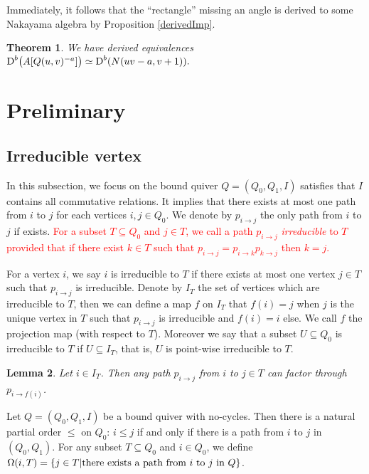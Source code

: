 \documentclass[a4paper, reqno]{amsart}
\newtheorem{thm}{Theorem}[section]
\newtheorem{lem}[thm]{Lemma}
\theoremstyle{definition}
\theoremstyle{remark}
\numberwithin{equation}{section}
\begin{document}
Immediately, it follows that the ``rectangle'' missing an angle is derived to some Nakayama algebra by Proposition \ref{derivedImp}.

\begin{thm}\label{main2}
We have derived equivalences 
${\textup{D}^{b}\big(A[Q(u,v)^{-a}]\big)} \simeq
    {\textup{D}^{b}( N(uv-a,v+1))}.$
\end{thm}
\newpage

\section{Preliminary}
\subsection{Irreducible vertex}
In this subsection, we focus on the bound quiver $Q=(Q_0,Q_1,I)$ satisfies that {\color{blue}$I$ contains all commutative relations.} It implies that there exists at most one path from $i$ to $j$ for each vertices $i,j\in Q_0$. We denote by $p_{i\to j}$ the only path from $i$ to $j$ if exists. \textcolor{red}{  For a subset $T\subseteq Q_0$ and $j\in T$, we call a path $p_{i\to j}$ \emph{irreducible} to $T$ provided that if there exist $k\in T$ such that $ p_{i\to j} = p_{i \to k} p_{k \to j} $ then $k=j$. } 

For a vertex $i$, we say $i$ is irreducible to $T$ if there exists at most one vertex $j\in T$ such that $p_{i\to j}$ is irreducible. {\color{blue}Denote by $I_T$ the set of vertices which are irreducible to $T$, then we can define a map $f$ on $I_T$ that $f(i)=j$ when $j$ is the unique vertex in $T$ such that $p_{i\rightarrow j}$ is irreducible and $f(i)=i$ else. We call $f$ the projection map (with respect to $T$). Moreover we say that a subset $U\subseteq Q_0$ is irreducible to $T$ if $U\subseteq I_T$, that is, $U$ is point-wise irreducible to $T$.}

\begin{lem}\label{factorthroughf}
Let $i\in I_T$. Then any path $p_{i\rightarrow j}$ from $i$ to $j\in T$ can factor through $p_{i\rightarrow f(i)}$.
\end{lem}

Let $Q=(Q_0,Q_1,I)$ be a bound quiver with no-cycles. Then there is a natural partial order $\leq$ on $Q_0$: $i\leq j$ if and only if there is a path from $i$ to $j$ in $(Q_0,Q_1)$. For any subset $T\subseteq Q_0$ and $i\in Q_0$, we define $\Omega(i,T)=\{j\in T|\textup{there exists a path from }i\textup{ to }j\textup{ in }Q\}$.
\end{document}
